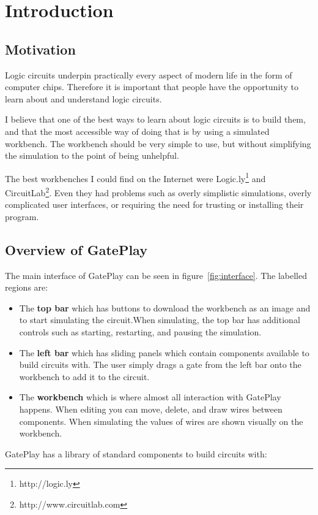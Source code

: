 \chapter{Introduction}

\section{Motivation}
Logic circuits underpin practically every aspect of modern life in the form of computer chips. Therefore it is important that people have the opportunity to learn about and understand logic circuits.

I believe that one of the best ways to learn about logic circuits is to build them, and that the most accessible way of doing that is by using a simulated workbench. The workbench should be very simple to use, but without simplifying the simulation to the point of being unhelpful.

The best workbenches I could find on the Internet were Logic.ly\footnote{http://logic.ly} and CircuitLab\footnote{http://www.circuitlab.com}. Even they had problems such as overly simplistic simulations, overly complicated user interfaces, or requiring the need for trusting or installing their program.


\section{Overview of GatePlay}
The main interface of GatePlay can be seen in figure~\ref{fig:interface}. The labelled regions are:

\begin{itemize}
	\item[1] The \textbf{top bar} which has buttons to download the workbench as an image and to start simulating the circuit.When simulating, the top bar has additional controls such as starting, restarting, and pausing the simulation.
	\item[2] The \textbf{left bar} which has sliding panels which contain components available to build circuits with. The user simply drags a gate from the left bar onto the workbench to add it to the circuit.
	\item[3] The \textbf{workbench} which is where almost all interaction with GatePlay happens. When editing you can move, delete, and draw wires between components. When simulating the values of wires are shown visually on the workbench.
\end{itemize}

GatePlay has a library of standard components to build circuits with:

